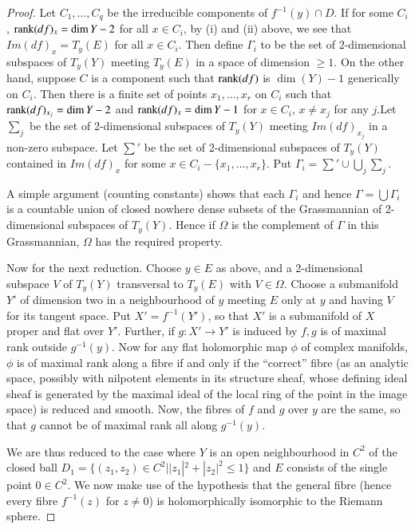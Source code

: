 \begin{proof}
Let $C_1, \ldots, C_q$ be the irreducible components of $f^{-1} (y) \cap D$. If for some $C_i$, $\operatorname{rank} (df)_x = \dim Y -2$ for all $x \in C_i$, by (i) and (ii) above, we see that $Im (df)_x = T_y(E)$ for all $x \in C_i$. Then define $\Gamma_i$ to be the set of 2-dimensional subspaces of $T_y(Y)$ meeting $T_y(E)$ in a space of dimension $\geqslant 1$. On the other hand, suppose $C$ is a component such that $\operatorname{rank} (df)$ is $\dim (Y)-1$ generically on $C_i$. Then there is a finite set of points $x_1, \ldots, x_r$ on $C_i$ such that $\operatorname{rank} (df)_{x_j} = \dim Y -2$ and $\operatorname{rank} (df)_x = \dim Y -1$ for $x \in C_i$, $x \neq x_j$ for any $j$.\pageoriginale Let $\sum_j$ be the set of 2-dimensional subspaces of $T_y(Y)$ meeting $Im(df)_{x_j}$ in a non-zero subspace. Let $\sum'$  be the set of 2-dimensional  subspaces of $T_y (Y)$ contained in $Im (df)_x$ for some $x \in C_i - \{x_1, \ldots, x_r\}$. Put $\Gamma_i = \sum' \cup \bigcup\limits_j \sum_j$.

A simple argument (counting constants) shows that each $\Gamma_i$ and hence $\Gamma = \bigcup \Gamma_i$ is a countable union of closed nowhere dense subsets of the Grassmannian of 2-dimensional subspaces of $T_y (Y)$. Hence if $\Omega$ is the complement of $\Gamma$ in this Grassmannian, $\Omega$ has the required property.

Now for the next reduction. Choose $y \in E$ as above, and a 2-dimensional subspace $V$ of $T_y(Y)$ transversal to $T_y(E)$ with $V \in \Omega$. Choose a submanifold $Y'$ of dimension two in a neighbourhood of $y$ meeting $E$ only at $y$ and having $V$ for its tangent space. Put $X' = f^{-1} (Y')$, so that $X'$ is a submanifold of $X$ proper and flat over $Y'$. Further, if $g: X' \to Y'$ is induced by $f,g$ is of maximal rank outside $g^{-1} (y)$. Now for any flat holomorphic map $\phi$ of complex manifolds, $\phi$ is of maximal rank along a fibre if and only if the ``correct'' fibre (as an analytic space, possibly with nilpotent elements in its structure sheaf, whose defining ideal sheaf is generated by the maximal ideal of the local ring of the point in the image space) is reduced and smooth. Now, the fibres of $f$ and $g$ over $y$ are the same, so that $g$ cannot be of maximal rank all along $g^{-1}(y)$.

We are thus reduced to the case where $Y$ is an open neighbourhood  in $C^2$ of the closed ball $D_1 = \{(z_1, z_2) \in C^2 || z_1|^2 + |z_2|^2 \leq 1\}$ and $E$ consists of the single point $0 \in C^2$. We now make use of the hypothesis that the general fibre (hence every fibre $f^{-1} (z)$ for $z \neq 0$) is holomorphically isomorphic to the Riemann sphere.


\end{proof}
